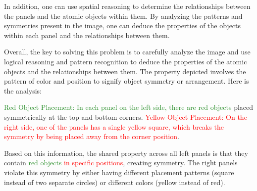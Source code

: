 \begin{tcolorbox}[breakable,enhanced jigsaw,opacityback=0,]
\begin{dialogue}
		In addition, one can use spatial reasoning to determine the relationships between the panels and the atomic objects within them. By analyzing the patterns and symmetries present in the image, one can deduce the properties of the objects within each panel and the relationships between them.
		
		Overall, the key to solving this problem is to carefully analyze the image and use logical reasoning and pattern recognition to deduce the properties of the atomic objects and the relationships between them.
		\vspace{1em}
		 The property depicted involves the pattern of color and position to signify object symmetry or arrangement. Here is the analysis:
		
		\textcolor{ForestGreen}{Red Object Placement: In each panel on the left side, there are red objects} placed symmetrically at the top and bottom corners.
		\textcolor{red}{Yellow Object Placement: On the right side, one of the panels has a single yellow square, which breaks the symmetry by being placed away from the corner position}.
		
		Based on this information, the shared property across all left panels is that they contain \textcolor{ForestGreen}{red objects} \textcolor{red}{in specific positions}, creating symmetry. The right panels violate this symmetry by either having different placement patterns (square instead of two separate circles) or different colors (yellow instead of red).
	\end{dialogue}
	\label{fig:task3-bongard}
\end{tcolorbox}




